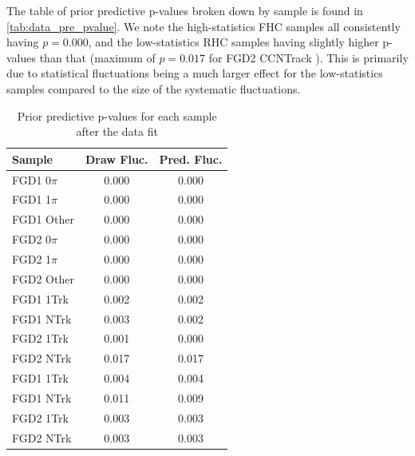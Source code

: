 The table of prior predictive p-values broken down by sample is found in \autoref{tab:data_pre_pvalue}. We note the high-statistics FHC samples all consistently having $p=0.000$, and the low-statistics RHC samples having slightly higher p-values than that (maximum of $p=0.017$ for FGD2 CCNTrack \numubar). This is primarily due to statistical fluctuations being a much larger effect for the low-statistics samples compared to the size of the systematic fluctuations.
\begin{table}[h]
	\centering
	\begin{tabular}{l | c c }
		\hline \hline
		Sample & Draw Fluc. & Pred. Fluc. \\
		\hline
		FGD1 0$\pi$ & 0.000 & 0.000 \\
		FGD1 1$\pi$ & 0.000 & 0.000 \\
		FGD1 Other  & 0.000 & 0.000 \\
		\hline
		FGD2 0$\pi$ & 0.000 & 0.000 \\
		FGD2 1$\pi$ & 0.000 & 0.000 \\
		FGD2 Other  & 0.000 & 0.000 \\
		\hline
		FGD1 1Trk & 0.002 & 0.002 \\
		FGD1 NTrk & 0.003 & 0.002 \\
		FGD2 1Trk & 0.001 & 0.000 \\
		FGD2 NTrk & 0.017 & 0.017 \\
		\hline
		FGD1 \numu 1Trk & 0.004 & 0.004 \\
		FGD1 \numu NTrk & 0.011 & 0.009 \\
		FGD2 \numu 1Trk & 0.003 & 0.003 \\
		FGD2 \numu NTrk & 0.003 & 0.003 \\
		\hline
		\hline
	\end{tabular}
	\caption{Prior predictive p-values for each sample after the data fit}
	\label{tab:data_pre_pvalue}
\end{table}

